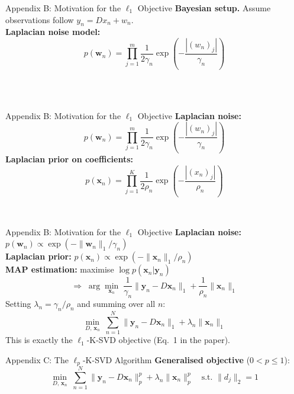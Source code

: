 \documentclass{beamer}
\begin{document}

\begin{frame}{Appendix B: Motivation for the $\ell_1$ Objective}
\textbf{Bayesian setup.} Assume observations follow $y_n = Dx_n + w_n$.\\[0.5em]
\textbf{Laplacian noise model:}
\[
p(\mathbf{w}_n)=\prod_{j=1}^{m}\frac{1}{2\gamma_n}\exp\!\left(-\frac{|(w_n)_j|}{\gamma_n}\right)
\]
\[
\phantom{p(\mathbf{x}_n)=\prod_{j=1}^{K}\frac{1}{2\rho_n}\exp\!\left(-\frac{|(x_n)_j|}{\rho_n}\right)}
\]
\phantom{Laplacian noise motivates $\ell_1$ data fidelity; Laplacian prior motivates $\ell_1$ regularisation.}
\end{frame}

\begin{frame}{Appendix B: Motivation for the $\ell_1$ Objective}
\textbf{Laplacian noise:}
\[
p(\mathbf{w}_n)=\prod_{j=1}^{m}\frac{1}{2\gamma_n}\exp\!\left(-\frac{|(w_n)_j|}{\gamma_n}\right)
\]
\textbf{Laplacian prior on coefficients:}
\[
p(\mathbf{x}_n)=\prod_{j=1}^{K}\frac{1}{2\rho_n}\exp\!\left(-\frac{|(x_n)_j|}{\rho_n}\right)
\]
\[
\phantom{\Rightarrow\;\arg\min_{\mathbf{x}_n}\;\frac{\lambda_n}{\mu_n}\|\mathbf{y}_n-D\mathbf{x}_n\|_1+\|\mathbf{x}_n\|_1}
\]
\end{frame}

\begin{frame}{Appendix B: Motivation for the $\ell_1$ Objective}
\textbf{Laplacian noise:} $p(\mathbf{w}_n)\propto\exp\!\left(-\|\mathbf{w}_n\|_1/\gamma_n\right)$\\[0.3em]
\textbf{Laplacian prior:} $p(\mathbf{x}_n)\propto\exp\!\left(-\|\mathbf{x}_n\|_1/\rho_n\right)$\\[0.5em]
\textbf{MAP estimation:} maximise $\log p(\mathbf{x}_n|\mathbf{y}_n)$
\[
\Rightarrow\;\arg\min_{\mathbf{x}_n}\;\frac{1}{\gamma_n}\|\mathbf{y}_n-D\mathbf{x}_n\|_1+\frac{1}{\rho_n}\|\mathbf{x}_n\|_1
\]
Setting $\lambda_n = \gamma_n/\rho_n$ and summing over all $n$:
\[
\boxed{\min_{D,\,\mathbf{x}_n}\;\sum_{n=1}^{N}\|\mathbf{y}_n-D\mathbf{x}_n\|_1+\lambda_n\|\mathbf{x}_n\|_1}
\]
This is exactly the $\ell_1$-K-SVD objective (Eq.\ 1 in the paper).
\end{frame}


\begin{frame}{Appendix C: The $\ell_p$-K-SVD Algorithm}
\textbf{Generalised objective} ($0<p\leq 1$):
\[
\min_{D,\,\mathbf{x}_n}\;\sum_{n=1}^{N}\|\mathbf{y}_n-D\mathbf{x}_n\|_p^p+\lambda_n\|\mathbf{x}_n\|_p^p
\quad\text{s.t. }\|d_j\|_2=1
\]
\[
\phantom{p_{\mathrm{gen}}(\mathbf{u})\propto\exp\!\left(-\frac{\|\mathbf{u}\|_p^p}{p\,\sigma^p}\right)}
\]
\phantom{For $0<p<1$: even heavier-tailed than Laplacian $\Rightarrow$ sparser solutions.}
\end{frame}
\end{document}

